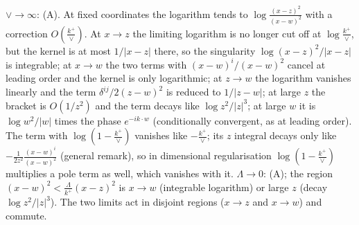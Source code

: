 \documentclass[9pt]{article}
\numberwithin{equation}{section}
\begin{document}
\par{}\par\medskip
\noindent $\vee\to\infty$: (A). At fixed coordinates the logarithm tends to $\log\frac{(x-z)^{2}}{(x-w)^{2}}$ with a correction $O(\frac{k^{+}}{\vee})$. At $x\to z$ the limiting logarithm is no longer cut off at $\log\frac{k^{+}}{\vee}$, but the kernel is at most $1/|x-z|$ there, so the singularity $\log(x-z)^{2}/|x-z|$ is integrable; at $x\to w$ the two terms with $(x-w)^{i}/(x-w)^{2}$ cancel at leading order and the kernel is only logarithmic; at $z\to w$ the logarithm vanishes linearly and the term $\delta^{ij}/2(z-w)^{2}$ is reduced to $1/|z-w|$; at large $z$ the bracket is $O(1/z^{2})$ and the term decays like $\log z^{2}/|z|^{3}$; at large $w$ it is $\log w^{2}/|w|$ times the phase $e^{-ik\cdot w}$ (conditionally convergent, as at leading order). The term with $\log(1-\frac{k^{+}}{\vee})$ vanishes like $-\frac{k^{+}}{\vee}$; its $z$ integral decays only like $-\frac{1}{2z^{2}}\frac{(x-w)^{i}}{(x-w)^{2}}$ (general remark), so in dimensional regularisation $\log(1-\frac{k^{+}}{\vee})$ multiplies a pole term as well, which vanishes with it. $\Lambda\to0$: (A); the region $(x-w)^{2}<\frac{\Lambda}{k^{+}}(x-z)^{2}$ is $x\to w$ (integrable logarithm) or large $z$ (decay $\log z^{2}/|z|^{3}$). The two limits act in disjoint regions ($x\to z$ and $x\to w$) and commute.
\end{document}
